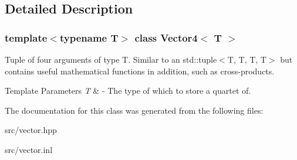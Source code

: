 \subsection{Detailed Description}
\subsubsection*{template$<$typename T$>$\newline
class Vector4$<$ T $>$}

Tuple of four arguments of type T. Similar to an std\+::tuple$<$\+T, T, T, T$>$ but contains useful mathematical functions in addition, such as cross-\/products. 
\begin{DoxyTemplParams}{Template Parameters}
{\em T} & -\/ The type of which to store a quartet of. \\
\hline
\end{DoxyTemplParams}


The documentation for this class was generated from the following files\+:\begin{DoxyCompactItemize}
\item 
src/vector.\+hpp\item 
src/vector.\+inl\end{DoxyCompactItemize}
